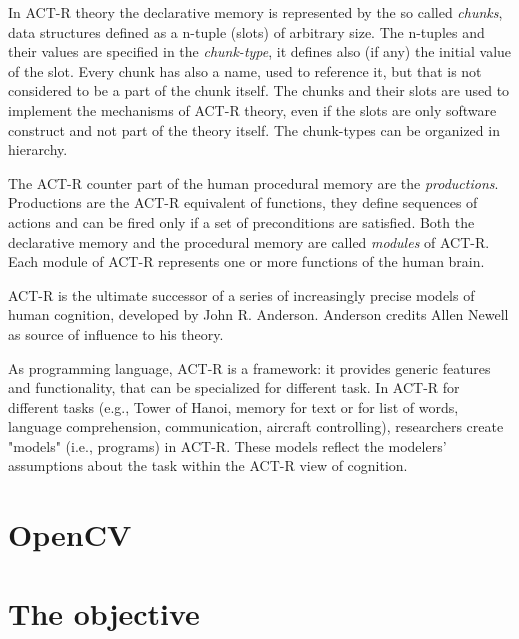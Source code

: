 In ACT-R theory the declarative memory is represented by the so called \emph{chunks}, data structures defined as a n-tuple (slots) of arbitrary size. The n-tuples and their values are specified in the \emph{chunk-type}, it defines also (if any) the initial value of the slot. Every chunk has also a name, used to reference it, but that is not considered to be a part of the chunk itself. The chunks and their slots are used to implement the mechanisms of ACT-R theory, even if the slots are only software construct and not part of the theory itself. The chunk-types can be organized in hierarchy.

The ACT-R counter part of the human procedural memory are the \emph{productions}. Productions are the ACT-R equivalent of functions, they define sequences of actions and can be fired only if a set of preconditions are satisfied. 
Both the declarative memory and the procedural memory are called \emph{modules} of ACT-R. Each module of ACT-R represents one or more functions of the human brain.

ACT-R is the ultimate successor of a series of increasingly precise models of human cognition, developed by John R. Anderson. Anderson credits Allen Newell as source of influence to his theory.


As programming language, ACT-R is a framework: it provides generic features and functionality, that can be specialized for different task. In ACT-R for different tasks 
(e.g., Tower of Hanoi, memory for text or for list of words, language comprehension, 
communication, aircraft controlling), researchers create "models" (i.e., programs) in ACT-R. 
These models reflect the modelers' assumptions about the task within the ACT-R view of 
cognition.
\section{OpenCV}
\section{The objective}